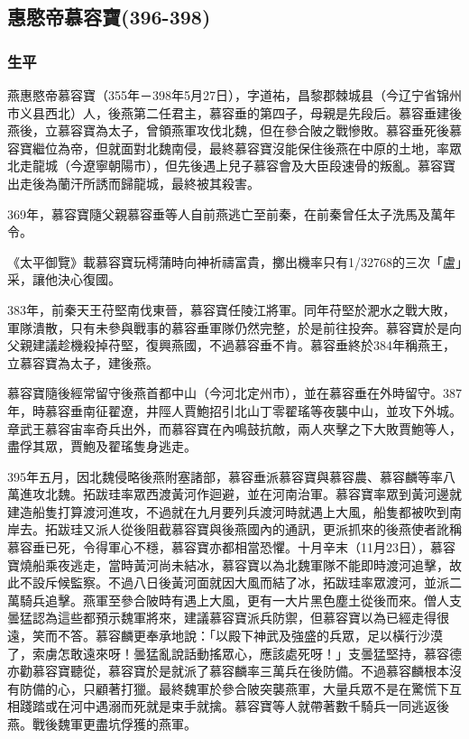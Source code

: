 
\subsection{惠愍帝慕容寶\tiny(396-398)}

\subsubsection{生平}

燕惠愍帝慕容寶（355年－398年5月27日），字道祐，昌黎郡棘城县（今辽宁省锦州市义县西北）人，後燕第二任君主，慕容垂的第四子，母親是先段后。慕容垂建後燕後，立慕容寶為太子，曾領燕軍攻伐北魏，但在參合陂之戰慘敗。慕容垂死後慕容寶繼位為帝，但就面對北魏南侵，最終慕容寶沒能保住後燕在中原的土地，率眾北走龍城（今遼寧朝陽市），但先後遇上兒子慕容會及大臣段速骨的叛亂。慕容寶出走後為蘭汗所誘而歸龍城，最終被其殺害。

369年，慕容寶隨父親慕容垂等人自前燕逃亡至前秦，在前秦曾任太子洗馬及萬年令。

《太平御覽》載慕容寶玩樗蒲時向神祈禱富貴，擲出機率只有1/32768的三次「盧」采，讓他決心復國。

383年，前秦天王苻堅南伐東晉，慕容寶任陵江將軍。同年苻堅於淝水之戰大敗，軍隊潰散，只有未參與戰事的慕容垂軍隊仍然完整，於是前往投奔。慕容寶於是向父親建議趁機殺掉苻堅，復興燕國，不過慕容垂不肯。慕容垂終於384年稱燕王，立慕容寶為太子，建後燕。

慕容寶隨後經常留守後燕首都中山（今河北定州市），並在慕容垂在外時留守。387年，時慕容垂南征翟遼，井陘人賈鮑招引北山丁零翟瑤等夜襲中山，並攻下外城。章武王慕容宙率奇兵出外，而慕容寶在內鳴鼓抗敵，兩人夾擊之下大敗賈鮑等人，盡俘其眾，賈鮑及翟瑤隻身逃走。

395年五月，因北魏侵略後燕附塞諸部，慕容垂派慕容寶與慕容農、慕容麟等率八萬進攻北魏。拓跋珪率眾西渡黃河作迴避，並在河南治軍。慕容寶率眾到黃河邊就建造船隻打算渡河進攻，不過就在九月要列兵渡河時就遇上大風，船隻都被吹到南岸去。拓跋珪又派人從後阻截慕容寶與後燕國內的通訊，更派抓來的後燕使者訛稱慕容垂已死，令得軍心不穩，慕容寶亦都相當恐懼。十月辛末（11月23日），慕容寶燒船乘夜逃走，當時黃河尚未結冰，慕容寶以為北魏軍隊不能即時渡河追擊，故此不設斥候監察。不過八日後黃河面就因大風而結了冰，拓跋珪率眾渡河，並派二萬騎兵追擊。燕軍至參合陂時有遇上大風，更有一大片黑色塵土從後而來。僧人支曇猛認為這些都預示魏軍將來，建議慕容寶派兵防禦，但慕容寶以為已經走得很遠，笑而不答。慕容麟更奉承地說：「以殿下神武及強盛的兵眾，足以橫行沙漠了，索虜怎敢遠來呀！曇猛亂說話動搖眾心，應該處死呀！」支曇猛堅持，慕容德亦勸慕容寶聽從，慕容寶於是就派了慕容麟率三萬兵在後防備。不過慕容麟根本沒有防備的心，只顧著打獵。最終魏軍於參合陂突襲燕軍，大量兵眾不是在驚慌下互相踐踏或在河中遇溺而死就是束手就擒。慕容寶等人就帶著數千騎兵一同逃返後燕。戰後魏軍更盡坑俘獲的燕軍。


